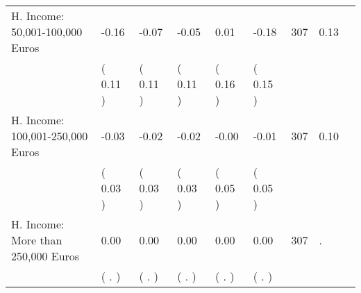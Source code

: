 \begin{tabular}{L{6.2cm} C{1.8cm} C{1.8cm} C{1.8cm} C{1.8cm} C{1.8cm} C{1.8cm} C{0.3cm} C{0.3cm}}
H. Income: 50,001-100,000 Euros &     -0.16 &     -0.07 &     -0.05 &      0.01 &     -0.18  & 307 &       0.13 \\ 
 & (     0.11 ) & (     0.11 ) & (     0.11 ) & (     0.16 ) & (     0.15 )  & \\
H. Income: 100,001-250,000 Euros &     -0.03 &     -0.02 &     -0.02 &     -0.00 &     -0.01  & 307 &       0.10 \\ 
 & (     0.03 ) & (     0.03 ) & (     0.03 ) & (     0.05 ) & (     0.05 )  & \\
H. Income: More than 250,000 Euros &      0.00 &      0.00 &      0.00 &      0.00 &      0.00  & 307 &          . \\ 
 & (        . ) & (        . ) & (        . ) & (        . ) & (        . )  & \\
\bottomrule
\end{tabular}
